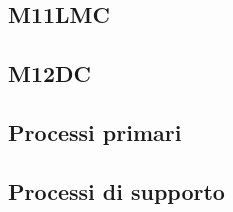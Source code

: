 {{{{{{{{{{{{{\subsection{M11LMC}
\subsection{M12DC}






\subsection{Processi primari}
    
   
\subsection{Processi di supporto}
\begin{comment}
    {\renewcommand{\arraystretch}{1.5}
    \begin{tabularx}{\textwidth}{p{0.05\textwidth}|p{0.35\textwidth}|X|X}
    \textbf{ID} & \textbf{Nome metrica} & \textbf{Valore accettabile} & \textbf{Valore ottimale}  \\
    \hline
    \multicolumn{4}{l}{\cellcolor{primarycolor}\textbf{\textit{Verifica}}} \\
    \hline
     &  &  &  \\
    \hline
     &  &  &  \\
    \hline
     &  &  &  \\
    \hline
     &  &  &  \\
    \hline
    \multicolumn{4}{l}{\cellcolor{primarycolor}\textbf{\textit{Gestione della qualità}}} \\
    \hline
     &  &  &  \\
    \end{tabularx}}  
  
\subsubsection{Documentazione}
    {\renewcommand{\arraystretch}{1.5}
    \begin{tabularx}{\textwidth}{p{0.15\textwidth}|p{0.35\textwidth}|X|X}
    \textbf{ID} & \textbf{Nome metrica} & \textbf{Valore accettabile} & \textbf{Valore ottimale}  \\
    \hline
    \multicolumn{4}{l}{\cellcolor{primarycolor}\textbf{\textit{Funzionalità}}} \\
    \hline
    MPD-CR & Copertura dei requisiti & 100 & 100 \\
    

\end{comment}}}}}}}}}}}}}}

